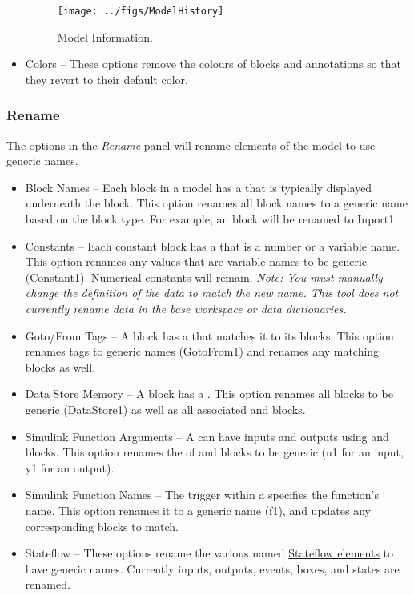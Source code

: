 \documentclass{article}
\begin{document}
\begin{itemize}
\begin{figure}[htb]
	\centering
	\texttt{[image: ../figs/ModelHistory]}
	\caption{Model Information.}
	\label{fig:model_history}
\end{figure}
	
	\item Colors -- These options remove the colours of blocks and annotations so that they revert to their default color.
\end{itemize}

\subsubsection{Rename}
\label{lbl:rename}
The options in the \emph{Rename} panel will rename elements of the model to use generic names.

\begin{itemize}
	\item Block Names -- Each block in a model has a  that is typically displayed underneath the block. This option renames all block names to a generic name based on the block type. For example, an \inport block will be renamed to Inport1.
	
	\item Constants -- Each constant block has a  that is a number or a variable name. This option renames any values that are variable names to be generic (\eg Constant1). Numerical constants will remain. \emph{Note: You must manually change the definition of the data to match the new name. This tool does not currently rename data in the base workspace or data dictionaries.}
	
	\item Goto/From Tags -- A \goto block has a  that matches it to its \from blocks. This option renames tags to generic names (\eg GotoFrom1) and renames any matching \from blocks as well.
	
	\item Data Store Memory -- A \DSM block has a . This option renames all  \DSM blocks to be generic (\eg DataStore1) as well as all associated \DSR and \DSW blocks.
	
	\item Simulink Function Arguments -- A \simfunc can have inputs and outputs using \argin and \argout blocks. This option renames the  of \argin and \argout blocks to be generic (\eg u1 for an input, y1 for an output).

	\item Simulink Function Names -- The trigger within a \simfunc specifies the function's name. This option renames it to a generic name (\eg f1), and updates any corresponding \simfunccaller blocks to match.
	
	\item Stateflow -- These options rename the various named \href{https://www.mathworks.com/help/stateflow/ug/overview-of-stateflow-objects.html}{Stateflow elements} to have generic names. Currently inputs, outputs, events, boxes, and states are renamed.
\end{itemize}
\end{document}
